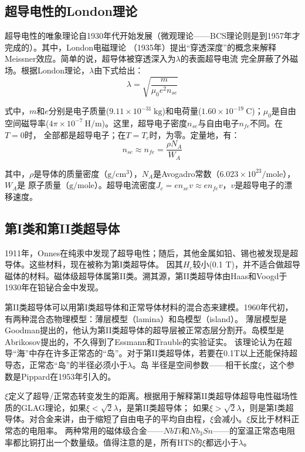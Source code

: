 \subsection{超导电性的London理论}
超导电性的唯象理论自1930年代开始发展（微观理论——BCS理论则是到1957年才完成的）。其中，London电磁理论
（1935年）提出“穿透深度”的概念来解释Meissner效应。简单的说，超导体被穿透深入为$\lambda$的表面超导电流
完全屏蔽了外磁场。根据London理论，$\lambda$由下式给出：
\begin{equation}
\lambda=\sqrt{\frac{m}{\mu_0 e^2 n_{se}}}
\end{equation}

式中，$m$和$e$分别是电子质量($9.11\times 10^{-31}\ \mathrm{kg}$)和电荷量($1.60\times 10^{-19}\ \mathrm{C}$)；$\mu_0$是自由
空间磁导率($4\pi \times 10^{-7}\ \mathrm{H/m}$)。这里，超导电子密度$n_{se}$与自由电子$n_{fe}$不同。在$T=0$时，
全部都是超导电子；在$T=T_c$时，为零。定量地，有：
\begin{equation}
n_{se}\approx n_{fe}=\frac{\rho N_A}{W_A}
\end{equation}

其中，$\rho$是导体的质量密度（$\mathrm{g/cm^3}$），$N_A$是Avogadro常数（$6.023\times 10^{23}/\mathrm{mole}$），$W_A$是
原子质量（$\mathrm{g/mole}$）。超导电流密度$J_c=e n_{se} v\approx e n_{fe} v$，$v$是超导电子的漂移速度。

\subsection{第I类和第II类超导体}
1911年，Onnes在纯汞中发现了超导电性；随后，其他金属如铅、锡也被发现是超导体。这些材料，现在被称为第I类超导体。
因其$H_c$较小(0.1 T)，并不适合做超导磁体的材料。磁体级超导体属第II类。溯其源，第II类超导体由Haas和Voogd于
1930年在铅铋合金中发现。

第II类超导体可以用第I类超导体和正常导体材料的混合态来建模。1960年代初，有两种混合态物理模型：薄层模型（lamina）和岛模型（island）。
薄层模型是Goodman提出的，他认为第II类超导体的超导层被正常态层分割开。岛模型是Abrikosov提出的，不久得到了Essmann和Trauble的实验证实。
该理论认为在超导“海”中存在许多正常态的“岛”。对于第II类超导体，若要在0.1T以上还能保持超导态，正常态“岛”的半径必须小于$\lambda$。岛
半径是空间参数——相干长度$\xi$，这个参数是Pippard在1953年引入的。

$\xi$定义了超导/正常态转变发生的距离。根据用于解释第II类超导体超导电性磁场性质的GLAG理论，如果$\xi < \sqrt{2}\lambda$，是第II类超导体；
如果$\xi >\sqrt{2}\lambda$，则是第I类超导体。对合金来讲，由于缩短了自由电子的平均自由程，$\xi$会减小。$\xi$反比于材料正常态的电阻率。
两种常用的磁体级合金——$NbTi$和$Nb_3Sn$——的室温正常态电阻率都比铜打出一个数量级。值得注意的是，所有HTS的$\xi$都远小于$\lambda$。

